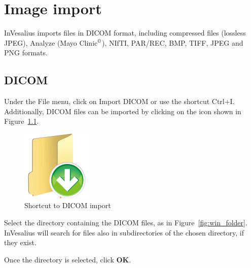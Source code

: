 \chapter{Image import}

InVesalius imports files in DICOM format, including compressed files (lossless JPEG), Analyze (Mayo Clinic$^\copyright$), NIfTI, PAR/REC, BMP, TIFF, JPEG and PNG formats.

\section{DICOM}

Under the File menu, click on Import DICOM or use the shortcut Ctrl+I. Additionally, DICOM files can be imported by clicking on the icon shown in Figure~\ref{fig:import}.

\begin{figure}[!htb]
\centering
\includegraphics[scale=0.2]{../user_guide_figures/icons/file_import_original.png}
\caption{Shortcut to DICOM import}
\label{fig:import}
\end{figure}

\hspace{.2cm}

Select the directory containing the DICOM files, as in Figure~\ref{fig:win_folder}. InVesalius will search for files also in subdirectories of the chosen directory,
if they exist.

\newpage

Once the directory is selected, click \textbf{OK}.


